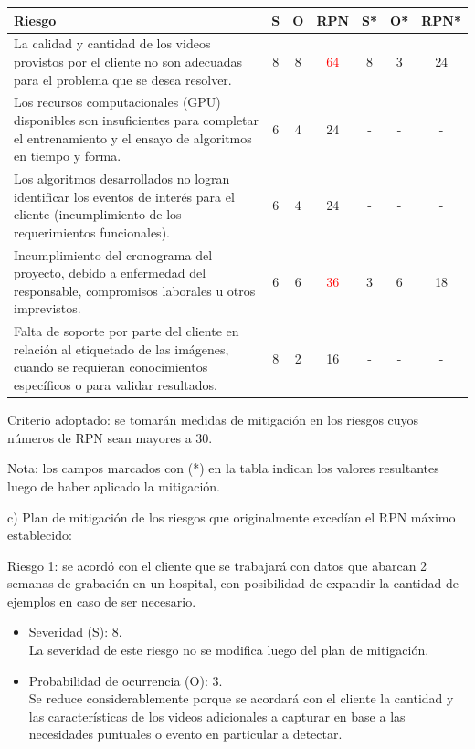 \documentclass[
11pt, %
]{charter}
\begin{document}
\begin{table}[htpb]
	\centering
	\begin{tabularx}{\linewidth}{@{}|X|c|c|c|c|c|c|@{}}
		\hline
		\rowcolor[HTML]{C0C0C0} 
		Riesgo & S & O & RPN & S* & O* & RPN* \\ \hline
		La calidad y cantidad de los videos provistos por el cliente no son adecuadas para el problema que se desea resolver.    & 8  & 8  &    \textcolor{red}{64} &  8  &  3  &  24    \\ \hline
		Los recursos computacionales (GPU) disponibles son insuficientes para completar el entrenamiento y el ensayo de algoritmos en tiempo y forma.   & 6  & 4  &  24   & -   &  -  &  -    \\ \hline
		Los algoritmos desarrollados no logran identificar los eventos de interés para el cliente (incumplimiento de los requerimientos funcionales).   & 6  &  4 &  24   & -   &  -  &   -   \\ \hline
		Incumplimiento del cronograma del proyecto, debido a enfermedad del responsable, compromisos laborales u otros imprevistos.     &  6 &   6 &  \textcolor{red}{36}   &  3  &  6  &  18    \\ \hline
		Falta de soporte por parte del cliente en relación al etiquetado de las imágenes, cuando se requieran conocimientos específicos o para validar resultados.    & 8   & 2  &   16  &  -  &  -  &   -   \\ \hline
	\end{tabularx}
\end{table}
\FloatBarrier

Criterio adoptado: 
se tomarán medidas de mitigación en los riesgos cuyos números de RPN sean mayores a 30.

Nota: los campos marcados con (*) en la tabla indican los valores resultantes luego de haber aplicado la mitigación.

c) Plan de mitigación de los riesgos que originalmente excedían el RPN máximo establecido:


Riesgo 1: se acordó con el cliente que se trabajará con datos que abarcan 2 semanas de grabación en un hospital, con posibilidad de expandir la cantidad de ejemplos en caso de ser necesario.
\begin{itemize}
	\item Severidad (S): 8.\\
	La severidad de este riesgo no se modifica luego del plan de mitigación.
	\item Probabilidad de ocurrencia (O): 3.\\
	Se reduce considerablemente porque se acordará con el cliente la cantidad y las características de los videos adicionales a capturar en base a las necesidades puntuales o evento en particular a detectar.
\end{itemize}  
\end{document}
